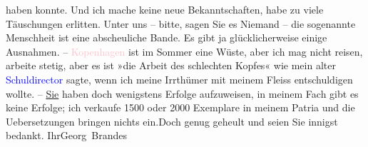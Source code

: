                haben konnte. Und ich mache keine neue Bekanntschaften, habe zu viele Täuschungen
               erlitten. Unter uns – bitte, sagen Sie es Niemand – die sogenannte Menschheit ist
               eine abscheuliche Bande. Es gibt ja glücklicherweise einige Ausnahmen. – \textcolor{pink}{Kopenhagen}{}\ledrightnote{\textcolor{pink}{Kopenhagen}} ist im Sommer eine Wüste, aber ich mag
               nicht reisen, arbeite stetig, aber es ist »die Arbeit des schlechten Kopfes« wie mein
               alter \textcolor{blue}{Schuldirector}{} sagte, wenn
               ich meine Irrthümer mit meinem Fleiss entschuldigen wollte. – \uline{Sie} haben doch wenigstens Erfolge aufzuweisen, in meinem Fach gibt es
               keine Erfolge; ich verkaufe 1500 oder 2000 Exemplare in meinem Patria und die
               Uebersetzungen bringen nichts ein.\hspace*{2em}Doch genug
               geheult und seien Sie innigst bedankt. Ihr\spacefill\mbox{Georg Brandes}\pend
           \endnumbering{}  
      